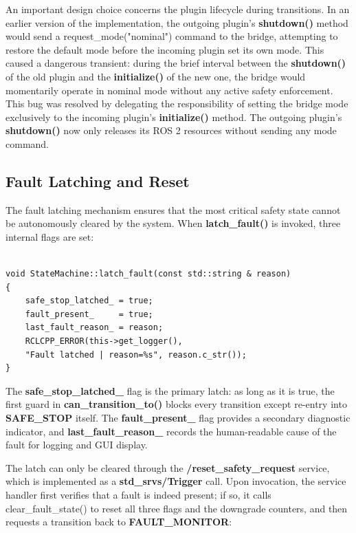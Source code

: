 An important design choice concerns the plugin lifecycle during transitions. In an earlier version of the implementation, the outgoing plugin's \textbf{shutdown()} method would send a request\_mode("nominal") command to the bridge, attempting to restore the default mode before the incoming plugin set its own mode. This caused a dangerous transient: during the brief interval between the \textbf{shutdown()} of the old plugin and the \textbf{initialize()} of the new one, the bridge would momentarily operate in nominal mode without any active safety enforcement. This bug was resolved by delegating the responsibility of setting the bridge mode exclusively to the incoming plugin's \textbf{initialize()} method. The outgoing plugin's \textbf{shutdown()} now only releases its ROS 2 resources without sending any mode command.

\subsection{Fault Latching and Reset}
The fault latching mechanism ensures that the most critical safety state cannot be autonomously cleared by the system. When \textbf{latch\_fault()} is invoked, three internal flags are set:

\begin{verbatim}

void StateMachine::latch_fault(const std::string & reason)
{
    safe_stop_latched_ = true;
    fault_present_     = true;
    last_fault_reason_ = reason;
    RCLCPP_ERROR(this->get_logger(),
    "Fault latched | reason=%s", reason.c_str());
}

\end{verbatim}

The \textbf{safe\_stop\_latched\_} flag is the primary latch: as long as it is true, the first guard in \textbf{can\_transition\_to()} blocks every transition except re-entry into \textbf{SAFE\_STOP} itself. The \textbf{fault\_present\_} flag provides a secondary diagnostic indicator, and \textbf{last\_fault\_reason\_} records the human-readable cause of the fault for logging and GUI display.

The latch can only be cleared through the \textbf{/reset\_safety\_request} service, which is implemented as a \textbf{std\_srvs/Trigger} call. Upon invocation, the service handler first verifies that a fault is indeed present; if so, it calls clear\_fault\_state() to reset all three flags and the downgrade counters, and then requests a transition back to \textbf{FAULT\_MONITOR}:

